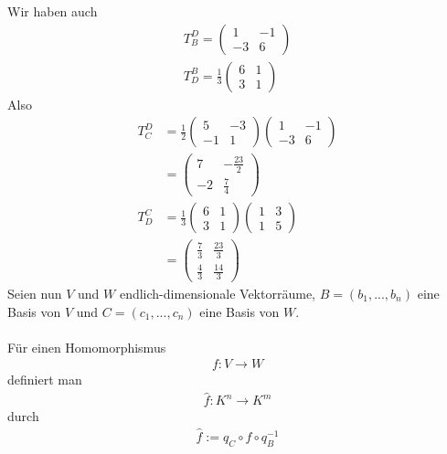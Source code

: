 \documentclass[11pt]{report}
\begin{document}
Wir haben auch
\begin{align}
T_{B}^{D} = \begin{pmatrix} 1 & -1 \\ -3 & 6\end{pmatrix} \\
T_{D}^{B} = \frac{1}{3}\begin{pmatrix} 6 & 1 \\ 3 & 1\end{pmatrix}
\end{align}
Also
\begin{align}
T_{C}^{D} &= \frac{1}{2} \begin{pmatrix} 5 & -3 \\ -1 & 1 \end{pmatrix} \begin{pmatrix} 1 & -1 \\ -3 & 6 \end{pmatrix} \\
&= \begin{pmatrix} 7 & -\frac{23}{2} \\ -2 & \frac{7}{4}\end{pmatrix} \\
T_{D}^{C} &= \frac{1}{3} \begin{pmatrix} 6 & 1 \\ 3 & 1 \end{pmatrix} \begin{pmatrix} 1 & 3 \\ 1 & 5 \end{pmatrix} \\
&= \begin{pmatrix} \frac{7}{3} & \frac{23}{3} \\ \frac{4}{3} & \frac{14}{3}\end{pmatrix} 
\end{align}
Seien nun $V$ und $W$ endlich-dimensionale Vektorräume, $B = (b_1, ..., b_n)$ eine Basis von $V$ und $C = (c_1, ..., c_n)$ eine Basis von $W$. \\\\
Für einen Homomorphismus
\begin{align}
f: V \rightarrow W
\end{align}
definiert man
\begin{align}
\hat{f} : K^n \rightarrow K^m
\end{align}
durch
\begin{align}
\hat{f} := q_C \circ f \circ q_B^{-1}
\end{align}
\end{document}
